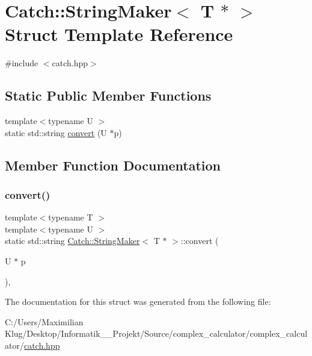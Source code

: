 \hypertarget{struct_catch_1_1_string_maker_3_01_t_01_5_01_4}{}\section{Catch\+:\+:String\+Maker$<$ T $\ast$ $>$ Struct Template Reference}
\label{struct_catch_1_1_string_maker_3_01_t_01_5_01_4}


{\ttfamily \#include $<$catch.\+hpp$>$}

\subsection*{Static Public Member Functions}
\begin{DoxyCompactItemize}
\item 
{\footnotesize template$<$typename U $>$ }\\static std\+::string \mbox{\hyperlink{struct_catch_1_1_string_maker_3_01_t_01_5_01_4_a2adbc75c99d71b8323f4052bcb0815c9}{convert}} (U $\ast$p)
\end{DoxyCompactItemize}


\subsection{Member Function Documentation}
\mbox{\label{struct_catch_1_1_string_maker_3_01_t_01_5_01_4_a2adbc75c99d71b8323f4052bcb0815c9}} 
\subsubsection{\texorpdfstring{convert()}{convert()}}
{\footnotesize\ttfamily template$<$typename T $>$ \\
template$<$typename U $>$ \\
static std\+::string \mbox{\hyperlink{struct_catch_1_1_string_maker}{Catch\+::\+String\+Maker}}$<$ T $\ast$ $>$\+::convert (\begin{DoxyParamCaption}\item[{U $\ast$}]{p }\end{DoxyParamCaption})\hspace{0.3cm}{\ttfamily [inline]}, {\ttfamily [static]}}



The documentation for this struct was generated from the following file\+:\begin{DoxyCompactItemize}
\item 
C\+:/\+Users/\+Maximilian Klug/\+Desktop/\+Informatik\+\_\+\_\+\+Projekt/\+Source/complex\+\_\+calculator/complex\+\_\+calculator/\mbox{\hyperlink{catch_8hpp}{catch.\+hpp}}\end{DoxyCompactItemize}
